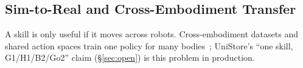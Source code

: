 \subsection{Sim-to-Real and Cross-Embodiment Transfer}
\label{sec:transfer}

A skill is only useful if it moves across robots. Cross-embodiment datasets and shared
action spaces train one policy for many bodies~\citep{openx}; UniStore's ``one skill,
G1/H1/B2/Go2'' claim (\S\ref{sec:open}) is this problem in production.
